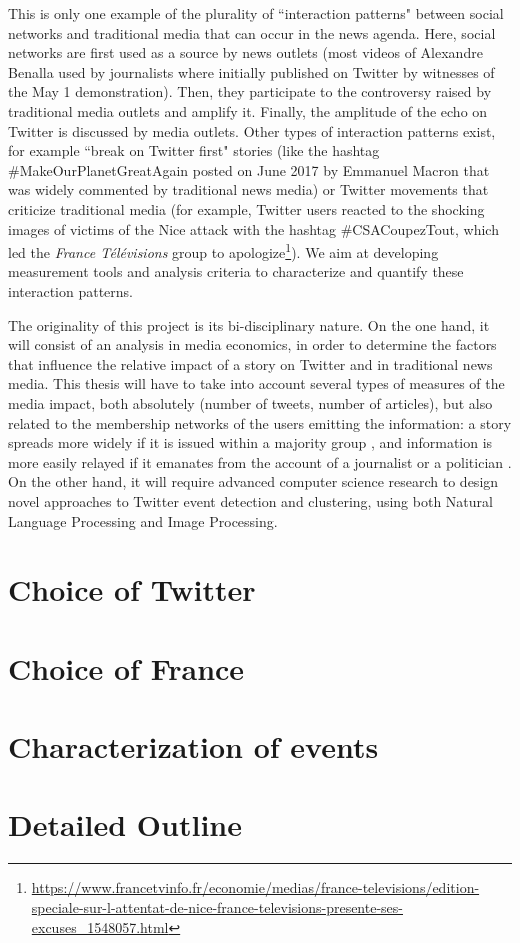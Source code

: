 This is only one example of the plurality of ``interaction patterns" \citep{ning_uncovering_2015} between social networks and traditional media that can occur in the news agenda. Here, social networks are first used as a source by news outlets (most videos of Alexandre Benalla used by journalists where initially published on Twitter by witnesses of the May 1 demonstration). Then, they participate to the controversy raised by traditional media outlets and amplify it. Finally, the amplitude of the echo on Twitter is discussed by media outlets. Other types of interaction patterns exist, for example ``break on Twitter first" stories (like the hashtag \#MakeOurPlanetGreatAgain posted on June 2017 by Emmanuel Macron that was widely commented by traditional news media) or Twitter movements that criticize traditional media (for example, Twitter users reacted to the shocking images of victims of the Nice attack with the hashtag \#CSACoupezTout, which led the \textit{France Télévisions} group to apologize\footnote{\url{https://www.francetvinfo.fr/economie/medias/france-televisions/edition-speciale-sur-l-attentat-de-nice-france-televisions-presente-ses-excuses_1548057.html}}). We aim at developing measurement tools and analysis criteria to characterize and quantify these interaction patterns.
\newline

The originality of this project is its bi-disciplinary nature. On the one hand, it will consist of an analysis in media economics, in order to determine the factors that influence the relative impact of a story on Twitter and in traditional news media. This thesis will have to take into account several types of measures of the media impact, both absolutely (number of tweets, number of articles), but also related to the membership networks of the users emitting the information:  a story spreads more widely if it is issued within a majority group \citep{HalberstamKnight2016}, and information is more easily relayed if it emanates from the account of a journalist or a politician \citep{harder_making_2016}. On the other hand, it will require advanced computer science research to design novel approaches to Twitter event detection and clustering, using both Natural Language Processing and Image Processing.
\newline

\section{Choice of Twitter}


\section{Choice of France}


\section{Characterization of events}


\section{Detailed Outline}
